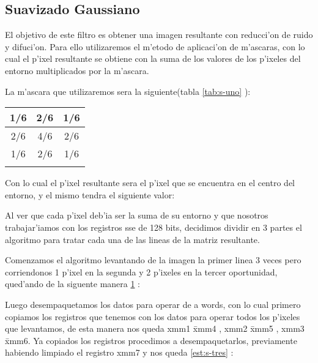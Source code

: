 \subsection{Suavizado Gaussiano}
El objetivo de este filtro es obtener una imagen resultante con reducci'on de ruido y difuci'on. 
Para ello utilizaremos el m'etodo de aplicaci'on de m'ascaras, con lo cual el p'ixel resultante se obtiene con la suma
de los valores de los p'ixeles del entorno multiplicados por la m'ascara.

La m'ascara que utilizaremos sera la siguiente(tabla \ref{tab:s-uno} ):

\begin{tabular}{| c | c | c |}
1/6 & 2/6 & 1/6 \\
\hline
2/6 & 4/6 & 2/6 \\
\hline
1/6 & 2/6 & 1/6 \\
\hline
\label{tab:s-uno}
\end{tabular}

Con lo cual el p'ixel resultante sera el p'ixel que se encuentra en el centro del entorno, y el mismo tendra el siguiente valor:

Al ver que cada p'ixel deb'ia ser la suma de su entorno y que nosotros trabajar'iamos con los registros sse de 128 bits, decidimos 
dividir en 3 partes el algoritmo para tratar cada una de las lineas de la matriz resultante.

Comenzamos el algoritmo levantando de la imagen la primer linea 3 veces pero corriendonos 1 p'ixel en la segunda y 2 p'ixeles en la 
tercer oportunidad, qued'ando de la siguente manera \ref{est:s-dos} :

\begin{figure}[ht]
\label{est:s-dos}
\end{figure}

Luego desempaquetamos los datos para operar de a words, con lo cual primero copiamos los registros que tenemos con los datos para operar todos los p'ixeles que levantamos, de esta manera nos queda xmm1 \= xmm4 , xmm2 \= xmm5 , xmm3 \= xmm6.
Ya copiados los registros procedimos a desempaquetarlos, previamente habiendo limpiado el registro xmm7 y nos queda \ref{est:s-tres} :

